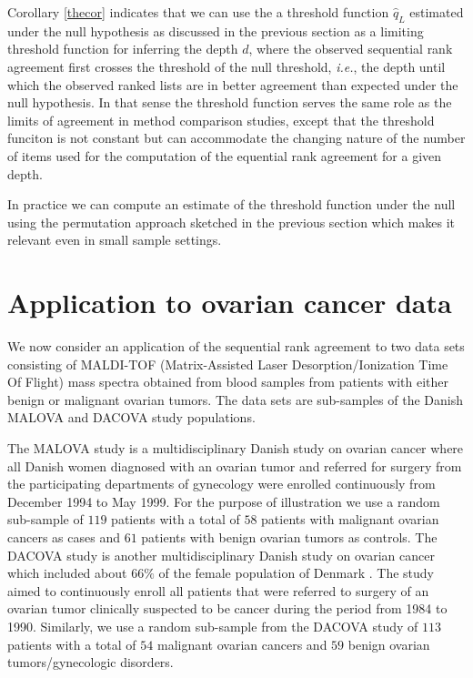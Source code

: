 \documentclass[12pt,a4paper]{article}
\makeatletter
\newcommand{\ie}{\emph{i.e.}\@\xspace}
\newcommand{\mcomment}[1]{\textcolor{red}{\textbf{#1}}}
\theoremstyle{plain}
\makeatother
\begin{document}
Corollary \ref{thecor} indicates that we can use the a threshold
function $\widehat{q}_L$ estimated under the null hypothesis as
discussed in the previous section as a limiting threshold function for
inferring the depth $d$, where the observed sequential rank agreement
first crosses the threshold of the null threshold, \ie, the depth
until which the observed ranked lists are in better agreement than
expected under the null hypothesis. In that sense the threshold
function serves the same role as the limits of agreement in method
comparison studies, except that the threshold funciton is not constant
but can accommodate the changing nature of the number of items used
for the computation of the equential rank agreement for a given depth.

In practice we can compute an estimate of the threshold function under
the null using the permutation approach sketched in the previous
section which makes it relevant even in small sample settings.


\section{Application to ovarian cancer data}
We now consider an application of the sequential rank agreement to two
data sets consisting of MALDI-TOF (Matrix-Assisted Laser
Desorption/Ionization Time Of Flight) mass spectra obtained from blood
samples from patients with either benign or malignant ovarian
tumors. The data sets are sub-samples of the Danish MALOVA and DACOVA
study populations.

The MALOVA study is a multidisciplinary Danish study on ovarian cancer
\citep{Hogdall:2004:Cancer:15160342} where all Danish women diagnosed
with an ovarian tumor and referred for surgery from the participating
departments of gynecology were enrolled continuously from December
1994 to May 1999. For the purpose of illustration we use a random
sub-sample of $119$ patients with a total of $58$ patients with
malignant ovarian cancers as cases and $61$ patients with benign
ovarian tumors as controls. The DACOVA study is another
multidisciplinary Danish study on ovarian cancer which included about
$66\%$ of the female population of Denmark
\citep{bertelsen1991protocol}. The study aimed to continuously enroll
all patients that were referred to surgery of an ovarian tumor
clinically suspected to be cancer during the period from 1984 to
1990. Similarly, we use a random sub-sample from the DACOVA study of
$113$ patients with a total of $54$ malignant ovarian cancers and $59$
benign ovarian tumors/gynecologic disorders.
\end{document}
